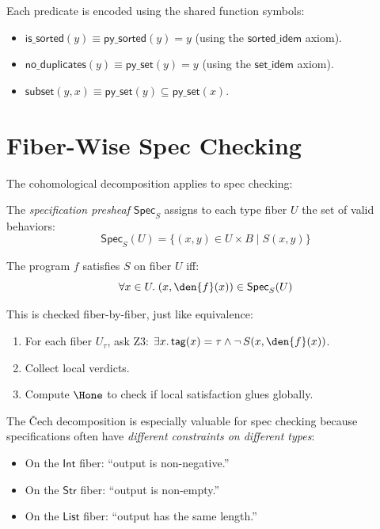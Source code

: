 Each predicate is encoded using the shared function symbols:
\begin{itemize}
  \item $\mathsf{is\_sorted}(y) \equiv \mathsf{py\_sorted}(y) = y$
    (using the $\mathsf{sorted\_idem}$ axiom).
  \item $\mathsf{no\_duplicates}(y) \equiv \mathsf{py\_set}(y) = y$
    (using the $\mathsf{set\_idem}$ axiom).
  \item $\mathsf{subset}(y, x) \equiv \mathsf{py\_set}(y) \subseteq
    \mathsf{py\_set}(x)$.
\end{itemize}

\section{Fiber-Wise Spec Checking}

The cohomological decomposition applies to spec checking:

\begin{definition}
The \emph{specification presheaf} $\mathsf{Spec}_S$ assigns to each
type fiber $U$ the set of valid behaviors:
\[
  \mathsf{Spec}_S(U) = \{(x, y) \in U \times B \mid S(x, y)\}
\]
\end{definition}

The program $f$ satisfies $S$ on fiber $U$ iff:
\[
  \forall x \in U.\; (x, \den{f}(x)) \in \mathsf{Spec}_S(U)
\]

This is checked fiber-by-fiber, just like equivalence:
\begin{enumerate}
  \item For each fiber $U_\tau$, ask Z3:
    $\exists x.\, \mathsf{tag}(x) = \tau \land \lnot\,S(x, \den{f}(x))$.
  \item Collect local verdicts.
  \item Compute $\Hone$ to check if local satisfaction glues globally.
\end{enumerate}

The \v{C}ech decomposition is especially valuable for spec checking
because specifications often have \emph{different constraints on
different types}:
\begin{itemize}
  \item On the $\mathsf{Int}$ fiber: ``output is non-negative.''
  \item On the $\mathsf{Str}$ fiber: ``output is non-empty.''
  \item On the $\mathsf{List}$ fiber: ``output has the same length.''
\end{itemize}


